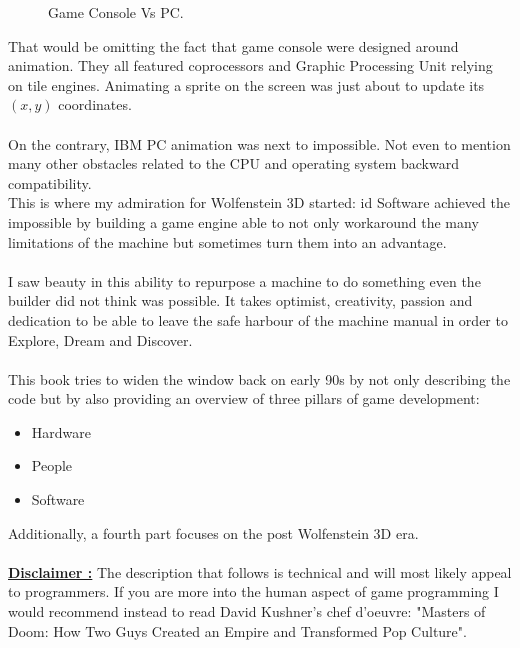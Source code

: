 \begin{figure}[H]
\centering
   \caption{Game Console Vs PC.} \label{fig:game_console_vs_PC}
 \end{figure}
 
That would be omitting the fact that game console were designed around animation. They all featured coprocessors and Graphic Processing Unit relying on tile engines. Animating a sprite on the screen was just about to update its $(x,y)$ coordinates.\\
\\
On the contrary, IBM PC animation was next to impossible. Not even to mention many other obstacles related to the CPU and operating system backward compatibility.\\ This is where my admiration for Wolfenstein 3D started: id Software achieved the impossible by building a game engine able to not only workaround the many limitations of the machine but sometimes turn them into an advantage.\\
\\
I saw beauty in this ability to repurpose a machine to do something even the builder did not think was possible. It takes optimist, creativity, passion and dedication to be able to leave the safe harbour of the machine manual in order to Explore, Dream and Discover.\\
\\
This book tries to widen the window back on early 90s by not only describing the code but by also providing an overview of three pillars of game development:\\
\begin{itemize}
\item Hardware
\item People
\item Software
\end{itemize}

Additionally, a fourth part focuses on the post Wolfenstein 3D era.\\
\\
 \textbf{\underline{Disclaimer :}} The description that follows is technical and will most likely appeal to programmers. If you are more into the human aspect of game programming I would recommend instead to read David Kushner's chef d'oeuvre: "Masters of Doom: How Two Guys Created an Empire and Transformed Pop Culture".\\
 \\